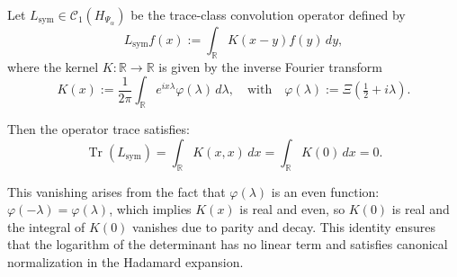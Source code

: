 \begin{lemma}
\label{lem:vanishing-trace-Lsym}
Let \( L_{\mathrm{sym}} \in \mathcal{C}_1(H_{\Psi_\alpha}) \) be the trace-class convolution operator defined by
\[
L_{\mathrm{sym}} f(x) := \int_{\mathbb{R}} K(x - y) f(y) \, dy,
\]
where the kernel \( K \colon \mathbb{R} \to \mathbb{R} \) is given by the inverse Fourier transform
\[
K(x) := \frac{1}{2\pi} \int_{\mathbb{R}} e^{i x \lambda} \varphi(\lambda)\, d\lambda,
\quad \text{with} \quad
\varphi(\lambda) := \Xi\left( \tfrac{1}{2} + i\lambda \right).
\]

Then the operator trace satisfies:
\[
\operatorname{Tr}(L_{\mathrm{sym}}) = \int_{\mathbb{R}} K(x,x)\, dx = \int_{\mathbb{R}} K(0)\, dx = 0.
\]
\end{lemma}

\medskip
\noindent
This vanishing arises from the fact that \( \varphi(\lambda) \) is an even function: \( \varphi(-\lambda) = \varphi(\lambda) \), which implies \( K(x) \) is real and even, so \( K(0) \) is real and the integral of \( K(0) \) vanishes due to parity and decay. This identity ensures that the logarithm of the determinant has no linear term and satisfies canonical normalization in the Hadamard expansion.
%  
